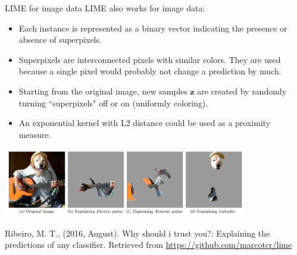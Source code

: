 \documentclass[11pt,compress,t,notes=noshow, xcolor=table]{beamer}
\newcommand{\zv}{\mathbf{z}}
\begin{document}
	\begin{vbframe}{LIME for image data}
	LIME also works for image data:  
	\begin{itemize}
		\item Each instance is represented as a binary vector indicating the presence or absence of superpixels. 
		\item Superpixels are interconnected pixels with similar colors. They are used because a single pixel would probably not change a prediction by much.
		\item Starting from the original image, new samples $\zv$ are created by randomly turning ``superpixels" off or on (uniformly coloring). 
		\item An exponential kernel with L2 distance could be used as a proximity measure.
	\end{itemize}
	\vspace{-0.3cm}
	\begin{center}
		\includegraphics[width=0.8\textwidth]{figure/lime-images}
	\end{center}
	\vspace{-0.3cm}
	\tiny{Ribeiro, M. T., (2016, August). Why should i trust you?: Explaining the predictions of any classifier. Retrieved from \url{https://github.com/marcotcr/lime}\par}
\end{vbframe}
\end{document}

